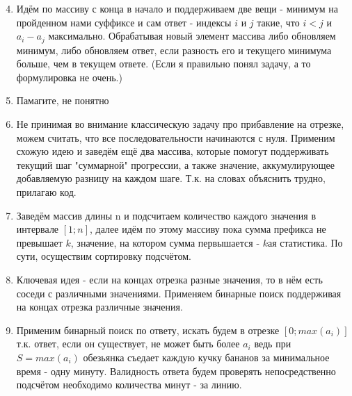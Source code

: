 \documentclass[a4paper,12pt]{article}
\begin{document}
\begin{enumerate}
\setcounter{enumi}{3}
\item Идём по массиву с конца в начало и поддерживаем две вещи - минимум на пройденном нами суффиксе и сам ответ - индексы $i$ и $j$ такие, что $i < j$ и $a_i - a_j$ максимально. Обрабатывая новый элемент массива либо обновляем минимум, либо обновляем ответ, если разность его и текущего минимума больше, чем в текущем ответе. (Если я правильно понял задачу, а то формулировка не очень.)

\item Памагите, не понятно

\item Не принимая во внимание классическую задачу про прибавление на отрезке, можем считать, что все последовательности начинаются с нуля. Применим схожую идею и заведём ещё два массива, которые помогут поддерживать текущий шаг "суммарной" прогрессии, а также значение, аккумулирующее добавляемую разницу на каждом шаге. Т.к. на словах объяснить трудно, прилагаю код.

\item Заведём массив длины n и подсчитаем количество каждого значения в интервале $[1; n]$, далее идём по этому массиву пока сумма префикса не превышает $k$, значение, на котором сумма первышается - $k$ая статистика. По сути, осуществим сортировку подсчётом.

\item Ключевая идея - если на концах отрезка разные значения, то в нём есть соседи с различными значениями. Применяем бинарные поиск поддерживая на концах отрезка различные значения.

\item Применим бинарный поиск по ответу, искать будем в отрезке $[0; max({a_i})]$ т.к. ответ, если он существует, не может быть более $a_i$ ведь при $S=max({a_i})$ обезьянка съедает каждую кучку бананов за минимальное время - одну минуту. Валидность ответа будем проверять непосредственно подсчётом необходимо количества минут - за линию.


\end{enumerate}
\end{document}
